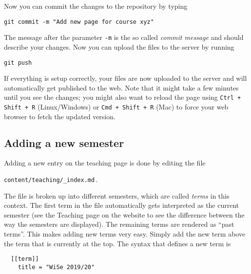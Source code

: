 \documentclass[a4paper,parskip=half]{scrartcl}
\begin{document}
Now you can commit the changes to the repository by typing
\begin{center}
  \texttt{git commit -m "Add new page for course xyz"}
\end{center}
The message after the parameter \texttt{-m} is the so called \emph{commit
  message} and should describe your changes. Now you can upload the files to the
server by running
\begin{center}
  \texttt{git push}
\end{center}
If everything is setup correctly, your files are now uploaded to the server and
will automatically get published to the web. Note that it might take a few
minutes until you see the changes; you might also want to reload the page using
\texttt{Ctrl + Shift + R} (Linux/Windows) or \texttt{Cmd + Shift + R} (Mac) to
force your web browser to fetch the updated version.

\subsection{Adding a new semester}
Adding a new entry on the teaching page is done by editing the file
\begin{center}
  \texttt{content/teaching/\_index.md}\,.
\end{center}
The file is broken up into different semesters, which are called \emph{terms} in
this context. The first term in the file automatically gets interpreted as the
current semester (see the Teaching page on the website to see the difference
between the way the semesters are displayed). The remaining terms are rendered
as ``past terms''. This makes adding new terms very easy. Simply add the new
term above the term that is currently at the top. The syntax that defines a new
term is
\begin{verbatim}
  [[term]]
    title = "WiSe 2019/20"
\end{verbatim}
\end{document}
